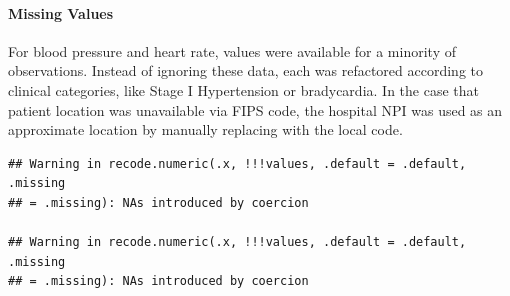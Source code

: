 \documentclass[preprint, 3p,
authoryear]{elsarticle} %
\newenvironment{Shaded}{\begin{snugshade}}{\end{snugshade}}
\newcommand{\AttributeTok}[1]{\textcolor[rgb]{0.77,0.63,0.00}{#1}}
\newcommand{\CommentTok}[1]{\textcolor[rgb]{0.56,0.35,0.01}{\textit{#1}}}
\newcommand{\ConstantTok}[1]{\textcolor[rgb]{0.00,0.00,0.00}{#1}}
\newcommand{\DecValTok}[1]{\textcolor[rgb]{0.00,0.00,0.81}{#1}}
\newcommand{\DocumentationTok}[1]{\textcolor[rgb]{0.56,0.35,0.01}{\textbf{\textit{#1}}}}
\newcommand{\FunctionTok}[1]{\textcolor[rgb]{0.00,0.00,0.00}{#1}}
\newcommand{\NormalTok}[1]{#1}
\newcommand{\OtherTok}[1]{\textcolor[rgb]{0.56,0.35,0.01}{#1}}
\newcommand{\SpecialCharTok}[1]{\textcolor[rgb]{0.00,0.00,0.00}{#1}}
\begin{document}
\hypertarget{missing-values}{%
\paragraph{Missing Values}\label{missing-values}}

For blood pressure and heart rate, values were available for a minority
of observations. Instead of ignoring these data, each was refactored
according to clinical categories, like Stage I Hypertension or
bradycardia. In the case that patient location was unavailable via FIPS
code, the hospital NPI was used as an approximate location by manually
replacing with the local code.

\begin{verbatim}
## Warning in recode.numeric(.x, !!!values, .default = .default, .missing
## = .missing): NAs introduced by coercion

## Warning in recode.numeric(.x, !!!values, .default = .default, .missing
## = .missing): NAs introduced by coercion
\end{verbatim}

\begin{Shaded}
\end{Shaded}
\end{document}
